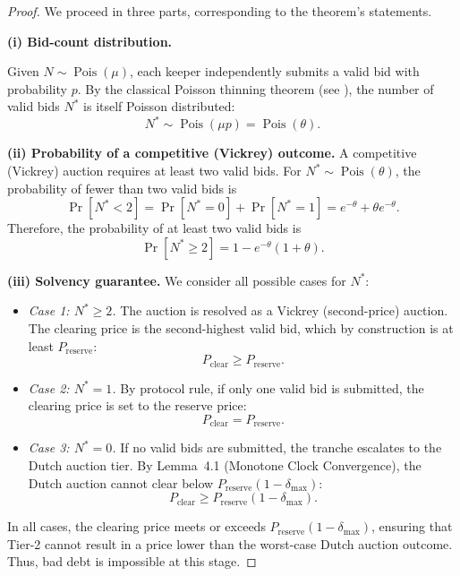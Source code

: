 \documentclass[11pt]{article}
\begin{document}
\begin{proof}
We proceed in three parts, corresponding to the theorem's statements.

\textbf{(i) Bid-count distribution.}  

Given $N \sim \operatorname{Pois}(\mu)$, each keeper independently submits a valid bid with probability $p$. By the classical Poisson thinning theorem (see \textcite[Thm.~5, \S~II.6]{feller1968}), the number of valid bids $N^*$ is itself Poisson distributed:
\[
    N^* \sim \operatorname{Pois}(\mu p) = \operatorname{Pois}(\theta).
\]

\textbf{(ii) Probability of a competitive (Vickrey) outcome.}  
A competitive (Vickrey) auction requires at least two valid bids. For $N^* \sim \operatorname{Pois}(\theta)$, the probability of fewer than two valid bids is
\[
    \Pr[N^* < 2] = \Pr[N^* = 0] + \Pr[N^* = 1] = e^{-\theta} + \theta e^{-\theta}.
\]
Therefore, the probability of at least two valid bids is
\[
    \Pr[N^* \geq 2] = 1 - e^{-\theta}(1 + \theta).
\]

\textbf{(iii) Solvency guarantee.}  
We consider all possible cases for $N^*$:
\begin{itemize}
    \item \emph{Case 1: $N^* \geq 2$.}  
        The auction is resolved as a Vickrey (second-price) auction. The clearing price is the second-highest valid bid, which by construction is at least $P_{\mathrm{reserve}}$:
        \[
            P_{\mathrm{clear}} \geq P_{\mathrm{reserve}}.
        \]
    \item \emph{Case 2: $N^* = 1$.}  
        By protocol rule, if only one valid bid is submitted, the clearing price is set to the reserve price:
        \[
            P_{\mathrm{clear}} = P_{\mathrm{reserve}}.
        \]
    \item \emph{Case 3: $N^* = 0$.}  
        If no valid bids are submitted, the tranche escalates to the Dutch auction tier. By Lemma~4.1 (Monotone Clock Convergence), the Dutch auction cannot clear below $P_{\mathrm{reserve}}(1-\delta_{\max})$:
        \[
            P_{\mathrm{clear}} \geq P_{\mathrm{reserve}}(1 - \delta_{\max}).
        \]
\end{itemize}
In all cases, the clearing price meets or exceeds $P_{\mathrm{reserve}}(1 - \delta_{\max})$, ensuring that Tier-2 cannot result in a price lower than the worst-case Dutch auction outcome. Thus, bad debt is impossible at this stage.
\end{proof}

\clearpage
\end{document}
